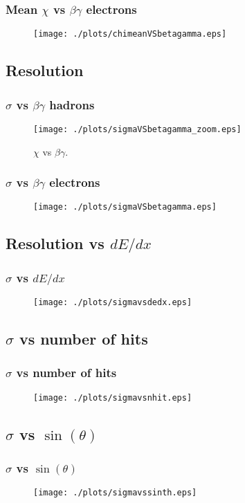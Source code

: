 \documentclass{beamer}
\begin{document}
\begin{frame}\frametitle{Mean $\chi$ vs $\beta \gamma$ electrons}
\begin{figure}
\texttt{[image: ./plots/chimeanVSbetagamma.eps]} 
\end{figure}
\end{frame}

\subsection{Resolution}
\begin{frame}\frametitle{$\sigma$ vs $\beta \gamma$ hadrons}
\begin{figure}
\texttt{[image: ./plots/sigmaVSbetagamma\_zoom.eps]} 
\caption{$\chi$ vs $\beta \gamma$.}
\end{figure}
\end{frame}

\begin{frame}\frametitle{$\sigma$ vs $\beta \gamma$ electrons}
\begin{figure}
\texttt{[image: ./plots/sigmaVSbetagamma.eps]} 
\end{figure}
\end{frame}

\subsection{Resolution vs $dE/dx$}
\begin{frame}\frametitle{$\sigma$ vs $dE/dx$ }
\begin{figure}
\texttt{[image: ./plots/sigmavsdedx.eps]} 
\end{figure}
\end{frame}

\subsection{$\sigma$ vs number of hits}
\begin{frame}\frametitle{$\sigma$ vs number of hits }
\begin{figure}
\texttt{[image: ./plots/sigmavsnhit.eps]} 
\end{figure}
\end{frame}

\subsection{$\sigma$ vs $\sin(\theta)$}
\begin{frame}\frametitle{$\sigma$ vs $\sin(\theta)$ }
\begin{figure}
\texttt{[image: ./plots/sigmavssinth.eps]} 
\end{figure}
\end{frame}
\end{document}
